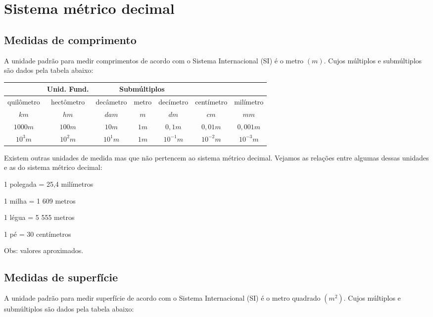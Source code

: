 \newpage
\section{Sistema métrico decimal}

\subsection{Medidas de comprimento}
A unidade padrão para medir comprimentos de acordo com o Sistema Internacional (SI) é o metro $(m)$. Cujos múltiplos e submúltiplos são dados pela tabela abaixo:

 \begin{table}[H]
 \centering
 \begin{tabular}{|c|c|c|c|c|c|c|} \hline
 \rowcolor{cinza}
  \multicolumn{3}{|c|}{\textbf{Múltiplos}}
 & \multicolumn{1}{|c|}{\textbf{Unid. Fund.}} & \multicolumn{3}{|c|}{\textbf{Submúltiplos}} \\ \hline
 quilômetro & hectômetro & decâmetro & metro & decímetro & centímetro & milímetro \\ \hline
 $km$ & $hm$ & $dam$ & $m$ & $dm$ & $cm$ & $mm$ \\ \hline
 $1000 m$ & $100 m$  & $10 m$ & $1 m$ & $0,1 m$ & $0,01 m$ & $0,001 m$ \\ \hline
 $10^3 m$ & $10^2 m$ & $10^1 m$ & $1 m$ & $10^{-1} m$ & $10^{-2} m$ & $10^{-3} m$ \\ \hline
 \end{tabular}
 \end{table}

 Existem outras unidades de medida mas que não pertencem ao sistema métrico decimal. Vejamos as relações entre algumas dessas unidades e as do sistema métrico decimal:

1 polegada = 25,4 milímetros

1 milha = 1 609 metros

1 légua = 5 555 metros

1 pé = 30 centímetros

Obs: valores aproximados.



\subsection{Medidas de superfície}
A unidade padrão para medir superfície de acordo com o Sistema Internacional (SI) é o metro quadrado $(m^2)$. Cujos múltiplos e submúltiplos são dados pela tabela abaixo:

